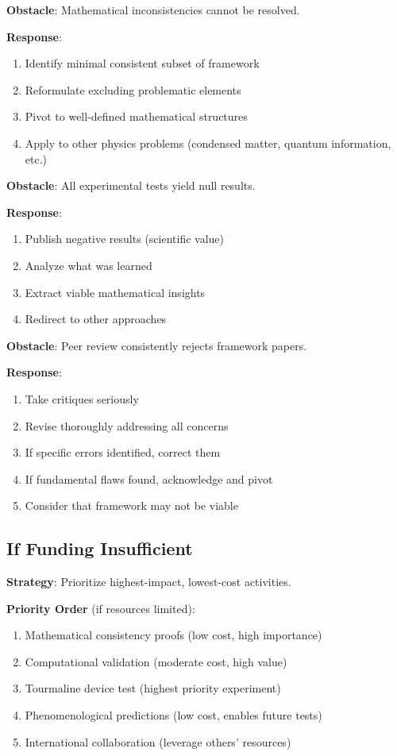 \textbf{Obstacle}: Mathematical inconsistencies cannot be resolved.

\textbf{Response}:
\begin{enumerate}
    \item Identify minimal consistent subset of framework
    \item Reformulate excluding problematic elements
    \item Pivot to well-defined mathematical structures
    \item Apply to other physics problems (condensed matter, quantum information, etc.)
\end{enumerate}

\textbf{Obstacle}: All experimental tests yield null results.

\textbf{Response}:
\begin{enumerate}
    \item Publish negative results (scientific value)
    \item Analyze what was learned
    \item Extract viable mathematical insights
    \item Redirect to other approaches
\end{enumerate}

\textbf{Obstacle}: Peer review consistently rejects framework papers.

\textbf{Response}:
\begin{enumerate}
    \item Take critiques seriously
    \item Revise thoroughly addressing all concerns
    \item If specific errors identified, correct them
    \item If fundamental flaws found, acknowledge and pivot
    \item Consider that framework may not be viable
\end{enumerate}

\subsection{If Funding Insufficient}

\textbf{Strategy}: Prioritize highest-impact, lowest-cost activities.

\textbf{Priority Order} (if resources limited):
\begin{enumerate}
    \item Mathematical consistency proofs (low cost, high importance)
    \item Computational validation (moderate cost, high value)
    \item Tourmaline device test (highest priority experiment)
    \item Phenomenological predictions (low cost, enables future tests)
    \item International collaboration (leverage others' resources)
\end{enumerate}

